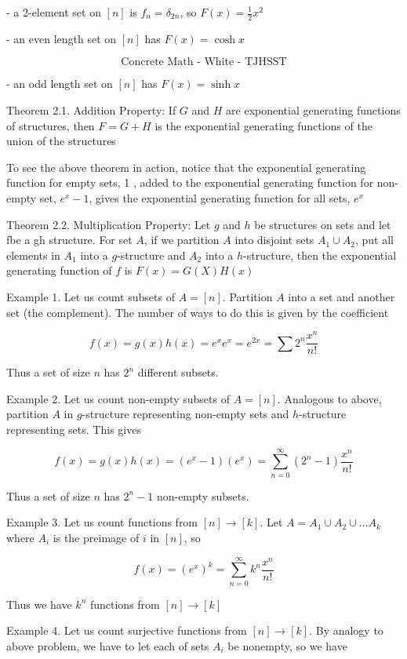 - a 2-element set on $[n]$ is $f_{n}=\delta_{2 n}$, so $F(x)=\frac{1}{2} x^{2}$

- an even length set on $[n]$ has $F(x)=\cosh x$

$$
\text { Concrete Math - White - TJHSST }
$$

- an odd length set on $[n]$ has $F(x)=\sinh x$

Theorem 2.1. Addition Property: If $G$ and $H$ are exponential generating functions of structures, then $F=G+H$ is the exponential generating functions of the union of the structures

To see the above theorem in action, notice that the exponential generating function for empty sets, 1 , added to the exponential generating function for non-empty set, $e^{x}-1$, gives the exponential generating function for all sets, $e^{x}$

Theorem 2.2. Multiplication Property: Let $g$ and $h$ be structures on sets and let fbe a gh structure. For set $A$, if we partition $A$ into disjoint sets $A_{1} \cup A_{2}$, put all elements in $A_{1}$ into a $g$-structure and $A_{2}$ into a $h$-structure, then the exponential generating function of $f$ is $F(x)=G(X) H(x)$

Example 1. Let us count subsets of $A=[n]$. Partition $A$ into a set and another set (the complement). The number of ways to do this is given by the coefficient

$$
f(x)=g(x) h(x)=e^{x} e^{x}=e^{2 x}=\sum 2^{n} \frac{x^{n}}{n !}
$$

Thus a set of size $n$ has $2^{n}$ different subsets.

Example 2. Let us count non-empty subsets of $A=[n]$. Analogous to above, partition $A$ in $g$-structure representing non-empty sets and $h$-structure representing sets. This gives

$$
f(x)=g(x) h(x)=\left(e^{x}-1\right)\left(e^{x}\right)=\sum_{n=0}^{\infty}\left(2^{n}-1\right) \frac{x^{n}}{n !}
$$

Thus a set of size $n$ has $2^{n}-1$ non-empty subsets.

Example 3. Let us count functions from $[n] \rightarrow[k]$. Let $A=A_{1} \cup A_{2} \cup \ldots A_{k}$ where $A_{i}$ is the preimage of $i$ in $[n]$, so

$$
f(x)=\left(e^{x}\right)^{k}=\sum_{n=0}^{\infty} k^{n} \frac{x^{n}}{n !}
$$

Thus we have $k^{n}$ functions from $[n] \rightarrow[k]$

Example 4. Let us count surjective functions from $[n] \rightarrow[k]$. By analogy to above problem, we have to let each of sets $A_{i}$ be nonempty, so we have

